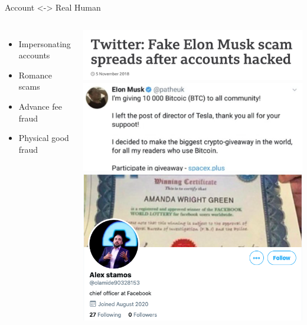 \documentclass[nobackground,dvipsnames,table,aspectratio=169]{beamer}
\begin{document}
\begin{frame}{Account <-> Real Human}
    \begin{columns}
            \begin{itemize}
                \item Impersonating accounts
                \item Romance scams
                \item Advance fee fraud
                \item Physical good fraud
            \end{itemize}
            \vspace{0.05\textheight}
            \includegraphics[width=\textwidth]{musk-scam-headline}
            \includegraphics[width=\textwidth]{musk-scam-tweet}
            \includegraphics[width=\textwidth]{fake-stamos-twitter}
    \end{columns}
\end{frame}
\end{document}
